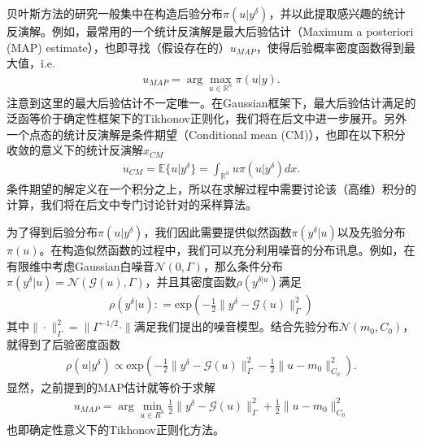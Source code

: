 \documentclass[a4paper,12pt,oneside,CJK]{cctbook}
\theoremstyle{definition}
\numberwithin{equation}{section}
\begin{document}
贝叶斯方法的研究一般集中在构造后验分布$\pi(u|y^{\delta})$，并以此提取感兴趣的统计反演解。例如，最常用的一个统计反演解是最大后验估计（Maximum a posteriori (MAP) estimate），也即寻找（假设存在的）$u_{MAP}$，使得后验概率密度函数得到最大值，i.e.
\begin{align*}
u_{MAP}=\arg\max_{u\in \mathbb{R}^n} \pi(u|y).
\end{align*}
注意到这里的最大后验估计不一定唯一。在Gaussian框架下，最大后验估计满足的泛函等价于确定性框架下的Tikhonov正则化，我们将在后文中进一步展开。另外一个点态的统计反演解是条件期望（Conditional mean (CM)），也即在以下积分收敛的意义下的统计反演解$x_{CM}$
\begin{align*}
u_{CM} = \mathbb{E}\{u|y^{\delta}\} = \int_{\mathbb{R}^n} u \pi(u|y^{\delta}) dx.
\end{align*}
条件期望的解定义在一个积分之上，所以在求解过程中需要讨论该（高维）积分的计算，我们将在后文中专门讨论针对的采样算法。

为了得到后验分布$\pi(u|y^{\delta})$，我们因此需要提供似然函数$\pi(y^{\delta}|u)$以及先验分布$\pi(u)$。在构造似然函数的过程中，我们可以充分利用噪音的分布讯息。例如，在有限维中考虑Gaussian白噪音$\mathcal{N}(0,\Gamma)$，那么条件分布$\pi(y^{\delta}|u)=\mathcal{N}(\mathcal{G}(u),\Gamma)$，并且其密度函数$\rho(y^{\delta|u})$满足
\begin{align*}
\rho(y^{\delta}|u): = \textrm{exp}\left(-\frac{1}{2}\|y^{\delta}-\mathcal{G}(u)\|_{\Gamma}^2\right)
\end{align*}
其中$\|\cdot\|_{\Gamma}^2 = \|\Gamma^{-1/2}\cdot\|$满足我们提出的噪音模型。结合先验分布$\mathcal{N}(m_0,C_0)$，就得到了后验密度函数
\begin{align*}
\rho(u|y^{\delta}) \propto \textrm{exp}\left(-\frac{1}{2}\|y^{\delta}-\mathcal{G}(u)\|_{\Gamma}^2-\frac{1}{2}\|u-m_0\|_{C_0}^2\right).
\end{align*}
显然，之前提到的MAP估计就等价于求解
\begin{align*}
u_{MAP} = \arg\min_{u\in R^n} \frac{1}{2}\|y^{\delta}-\mathcal{G}(u)\|_{\Gamma}^2+\frac{1}{2}\|u-m_0\|_{C_0}^2
\end{align*}
也即确定性意义下的Tikhonov正则化方法。
\end{document}
